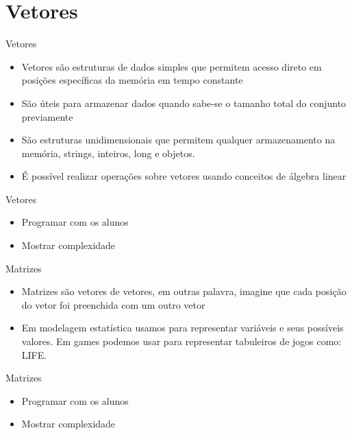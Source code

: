 \section*{Vetores}

\begin{frame}
	\begin{block}{Vetores}
		\begin{itemize}
			\item Vetores são estruturas de dados simples que permitem acesso direto em posições específicas da memória em tempo constante

			\item São úteis para armazenar dados quando sabe-se o tamanho total do conjunto previamente
			
			\item São estruturas unidimensionais que permitem qualquer armazenamento na memória, strings, inteiros, long e objetos.
			
			\item É possível realizar operações sobre vetores usando conceitos de álgebra linear
		\end{itemize}
	\end{block}
\end{frame}

\begin{frame}
	\begin{block}{Vetores}
		\begin{itemize}
			\item Programar com os alunos
			\item Mostrar complexidade
		\end{itemize}
	\end{block}
\end{frame}

\begin{frame}
	\begin{block}{Matrizes}
		\begin{itemize}
			\item Matrizes são vetores de vetores, em outras palavra, imagine que cada posição do vetor foi preenchida com um outro vetor

			\item Em modelagem estatística usamos para representar variáveis e seus possíveis valores. Em games podemos usar para representar tabuleiros de jogos como: LIFE.
		\end{itemize}
	\end{block}
\end{frame}

\begin{frame}
	\begin{block}{Matrizes}
		\begin{itemize}
			\item Programar com os alunos
			\item Mostrar complexidade
		\end{itemize}
	\end{block}
\end{frame}

